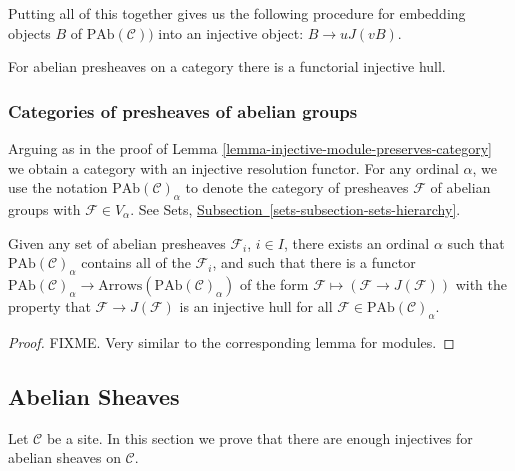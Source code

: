 \smallskip\noindent
Putting all of this together gives us the following procedure
for embedding objects $B$ of $\text{PAb}(\mathcal{C}))$ into
an injective object: $B \to uJ(vB)$.

\begin{proposition}
\label{proposition-presheaves-injectives}
For abelian presheaves on a category there is a functorial injective hull.
\end{proposition}

\subsubsection{Categories of presheaves of abelian groups}
\label{subsubsection-category-presheaves}

\noindent
Arguing as in the proof of
Lemma \ref{lemma-injective-module-preserves-category} we obtain a category
with an injective resolution functor. For any ordinal $\alpha$,
we use the notation $\text{PAb}(\mathcal{C})_\alpha$ to denote the category
of presheaves $\mathcal{F}$ of abelian groups with $\mathcal{F} \in V_\alpha$.
See Sets, \hyperref[sets-subsection-sets-hierarchy]%
{Subsection~\ref*{sets-subsection-sets-hierarchy}}.

\begin{lemma} 
\label{lemma-injective-presheaf-preserves-category}
Given any set of abelian presheaves $\mathcal{F}_i$, $i\in I$, there
exists an ordinal $\alpha$ such that $\text{PAb}(\mathcal{C})_\alpha$
contains all of the $\mathcal{F}_i$, and such that there is a functor
$\text{PAb}(\mathcal{C})_\alpha \to
\text{Arrows}(\text{PAb}(\mathcal{C})_\alpha)$
of the form $\mathcal{F} \mapsto (\mathcal{F} \to J(\mathcal{F}))$
with the property that $\mathcal{F} \to J(\mathcal{F})$ is an injective
hull for all $\mathcal{F} \in \text{PAb}(\mathcal{C})_\alpha$.
\end{lemma}

\begin{proof}
FIXME. Very similar to the corresponding lemma for modules.
\end{proof}

\subsection{Abelian Sheaves}
\label{subsection-injectives-sheaves}

\noindent
Let $\mathcal{C}$ be a site. In this section we prove that there are 
enough injectives for abelian sheaves on $\mathcal{C}$. 

